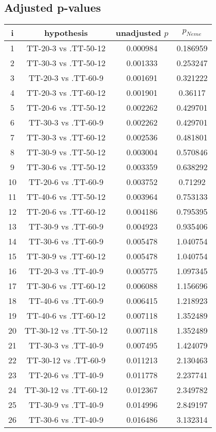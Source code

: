 \documentclass[a4paper,10pt]{article}
\begin{document}
\begin{landscape}
\pagebreak

\subsection{Adjusted p-values}

\begin{table}[!htp]
\centering\scriptsize
\begin{tabular}{cccc}
i&hypothesis&unadjusted $p$&$p_{Neme}$\\
\hline1&TT-20-3 vs .TT-50-12&0.000984&0.186959\\
2&TT-30-3 vs .TT-50-12&0.001333&0.253247\\
3&TT-20-3 vs .TT-60-9&0.001691&0.321222\\
4&TT-20-3 vs .TT-60-12&0.001901&0.36117\\
5&TT-20-6 vs .TT-50-12&0.002262&0.429701\\
6&TT-30-3 vs .TT-60-9&0.002262&0.429701\\
7&TT-30-3 vs .TT-60-12&0.002536&0.481801\\
8&TT-30-9 vs .TT-50-12&0.003004&0.570846\\
9&TT-30-6 vs .TT-50-12&0.003359&0.638292\\
10&TT-20-6 vs .TT-60-9&0.003752&0.71292\\
11&TT-40-6 vs .TT-50-12&0.003964&0.753133\\
12&TT-20-6 vs .TT-60-12&0.004186&0.795395\\
13&TT-30-9 vs .TT-60-9&0.004923&0.935406\\
14&TT-30-6 vs .TT-60-9&0.005478&1.040754\\
15&TT-30-9 vs .TT-60-12&0.005478&1.040754\\
16&TT-20-3 vs .TT-40-9&0.005775&1.097345\\
17&TT-30-6 vs .TT-60-12&0.006088&1.156696\\
18&TT-40-6 vs .TT-60-9&0.006415&1.218923\\
19&TT-40-6 vs .TT-60-12&0.007118&1.352489\\
20&TT-30-12 vs .TT-50-12&0.007118&1.352489\\
21&TT-30-3 vs .TT-40-9&0.007495&1.424079\\
22&TT-30-12 vs .TT-60-9&0.011213&2.130463\\
23&TT-20-6 vs .TT-40-9&0.011778&2.237741\\
24&TT-30-12 vs .TT-60-12&0.012367&2.349782\\
25&TT-30-9 vs .TT-40-9&0.014996&2.849197\\
26&TT-30-6 vs .TT-40-9&0.016486&3.132314\\

\end{tabular}
\end{table}
\end{landscape}
\end{document}
